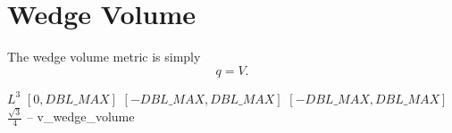 \section{Wedge Volume}

The wedge volume metric is simply
\[
q = V.
\]

%
{$L^3$}%
{$[0,DBL\_MAX]$}%
{$[-DBL\_MAX,DBL\_MAX]$}%
{$[-DBL\_MAX,DBL\_MAX]$}%
{$\frac{\sqrt{3}}{4}$}%
{--}%
{v\_wedge\_volume}%
